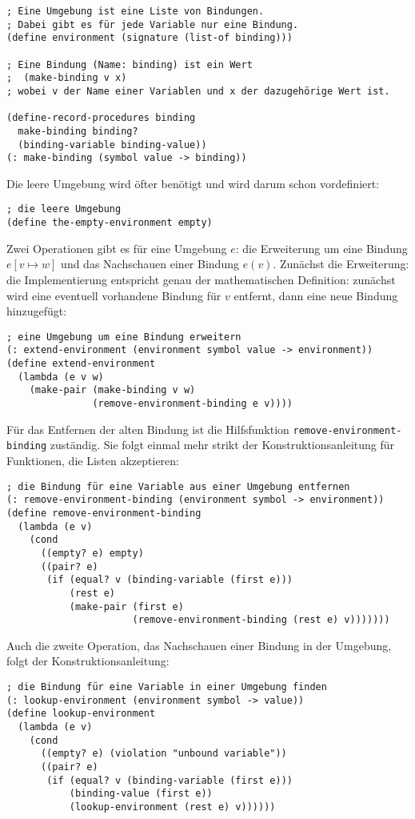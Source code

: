 \begin{verbatim}
; Eine Umgebung ist eine Liste von Bindungen.
; Dabei gibt es für jede Variable nur eine Bindung.
(define environment (signature (list-of binding)))

; Eine Bindung (Name: binding) ist ein Wert
;  (make-binding v x)
; wobei v der Name einer Variablen und x der dazugehörige Wert ist.

(define-record-procedures binding
  make-binding binding?
  (binding-variable binding-value))
(: make-binding (symbol value -> binding))
\end{verbatim}
% 
Die leere Umgebung wird öfter benötigt und wird darum schon
vordefiniert:
%
\begin{verbatim}
; die leere Umgebung
(define the-empty-environment empty)
\end{verbatim}
%
Zwei Operationen gibt es für eine Umgebung $e$: die Erweiterung um
eine Bindung $e[v\mapsto w]$ und das Nachschauen einer Bindung
$e(v)$.  Zunächst die Erweiterung: die Implementierung entspricht
genau der mathematischen Definition: zunächst wird eine eventuell
vorhandene Bindung für $v$ entfernt, dann eine neue Bindung
hinzugefügt:
% 
\begin{verbatim}
; eine Umgebung um eine Bindung erweitern
(: extend-environment (environment symbol value -> environment))
(define extend-environment
  (lambda (e v w)
    (make-pair (make-binding v w)
               (remove-environment-binding e v))))
\end{verbatim}
%
Für das Entfernen der alten Bindung ist die Hilfsfunktion
\texttt{remove-environment-binding} zuständig.  Sie folgt einmal mehr
strikt der Konstruktionsanleitung für Funktionen, die Listen akzeptieren:
\begin{verbatim}
; die Bindung für eine Variable aus einer Umgebung entfernen
(: remove-environment-binding (environment symbol -> environment))
(define remove-environment-binding
  (lambda (e v)
    (cond
      ((empty? e) empty)
      ((pair? e)
       (if (equal? v (binding-variable (first e)))
           (rest e)
           (make-pair (first e)
                      (remove-environment-binding (rest e) v)))))))
\end{verbatim} 
%
Auch die zweite Operation, das Nachschauen einer Bindung in der
Umgebung, folgt der Konstruktionsanleitung:
%
%
\begin{verbatim}
; die Bindung für eine Variable in einer Umgebung finden
(: lookup-environment (environment symbol -> value))
(define lookup-environment
  (lambda (e v)
    (cond
      ((empty? e) (violation "unbound variable"))
      ((pair? e)
       (if (equal? v (binding-variable (first e)))
           (binding-value (first e))
           (lookup-environment (rest e) v))))))
\end{verbatim}
